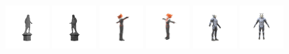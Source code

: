 \begin{figure}[htbp]
  \centering
  \includegraphics[width=0.15\textwidth]{images/data/samples/1.1.jpeg}\hspace{0.01\textwidth}%
  \includegraphics[width=0.15\textwidth]{images/data/samples/1.2.jpeg}\hfill
  \includegraphics[width=0.15\textwidth]{images/data/samples/2.1.jpeg}\hspace{0.01\textwidth}%
  \includegraphics[width=0.15\textwidth]{images/data/samples/2.2.jpeg}\hfill
  \includegraphics[width=0.15\textwidth]{images/data/samples/3.1.jpeg}\hspace{0.01\textwidth}%
  \includegraphics[width=0.15\textwidth]{images/data/samples/3.2.jpeg}\\
  \vspace{2mm} %


\end{figure}

